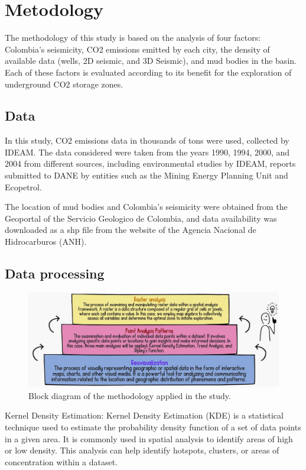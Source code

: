 \documentclass{ifacconf}
\begin{document}
\section{Metodology}
The methodology of this study is based on the analysis of four factors: Colombia's seismicity, CO2 emissions emitted by each city, the density of available data (wells, 2D seismic, and 3D Seismic), and mud bodies in the basin. Each of these factors is evaluated according to its benefit for the exploration of underground CO2 storage zones.

\subsection{Data}
In this study, CO2 emissions data in thousands of tons were used, collected by IDEAM. The data considered were taken from the years 1990, 1994, 2000, and 2004 from different sources, including environmental studies by IDEAM, reports submitted to DANE by entities such as the Mining Energy Planning Unit and Ecopetrol.

The location of mud bodies and Colombia's seismicity were obtained from the Geoportal of the Servicio Geologico de Colombia, and data availability was downloaded as a shp file from the website of the Agencia Nacional de Hidrocarburos (ANH).

\subsection{Data processing}

\begin{figure}[h]
	\centering
	\includegraphics[width=1\linewidth]{img/metodologia}
	\caption[methodology]{Block diagram of the methodology applied in the study.}
	\label{fig:metodologia}
\end{figure}

Kernel Density Estimation: Kernel Density Estimation (KDE) is a statistical technique used to estimate the probability density function of a set of data points in a given area. It is commonly used in spatial analysis to identify areas of high or low density. This analysis can help identify hotspots, clusters, or areas of concentration within a dataset.
\end{document}
